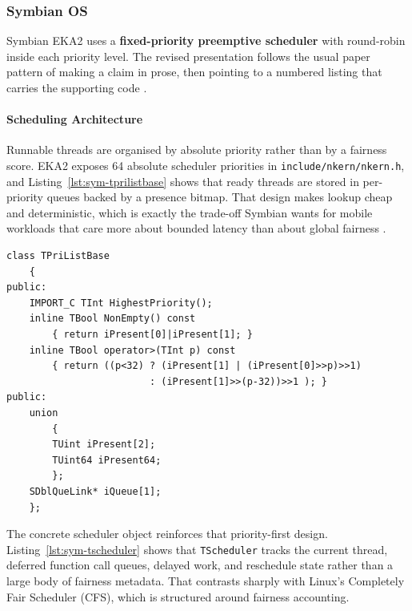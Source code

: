 \subsubsection{Symbian OS}


Symbian EKA2 uses a \textbf{fixed-priority preemptive scheduler} with
round-robin inside each priority level. The revised presentation follows the
usual paper pattern of making a claim in prose, then pointing to a numbered
listing that carries the supporting code \citep{symbian_eka2_kernel}.

\paragraph{Scheduling Architecture}

Runnable threads are organised by absolute priority rather than by a fairness
score. EKA2 exposes 64 absolute scheduler priorities in
\texttt{include/nkern/nkern.h}, and Listing~\ref{lst:sym-tprilistbase} shows
that ready threads are stored in per-priority queues backed by a presence
bitmap. That design makes lookup cheap and deterministic, which is exactly the
trade-off Symbian wants for mobile workloads that care more about bounded
latency than about global fairness \citep{sales2005, symbian_eka2_kernel}.

\begin{listing}[H]
\begin{verbatim}
class TPriListBase
	{
public:
	IMPORT_C TInt HighestPriority();
	inline TBool NonEmpty() const
		{ return iPresent[0]|iPresent[1]; }
	inline TBool operator>(TInt p) const
		{ return ((p<32) ? (iPresent[1] | (iPresent[0]>>p)>>1)
		                 : (iPresent[1]>>(p-32))>>1 ); }
public:
	union
		{
		TUint iPresent[2];
		TUint64 iPresent64;
		};
	SDblQueLink* iQueue[1];
	};
\end{verbatim}
\caption{Priority bitmap and ready-queue anchors in \texttt{nklib.h}.}
\label{lst:sym-tprilistbase}
\end{listing}

The concrete scheduler object reinforces that priority-first design.
Listing~\ref{lst:sym-tscheduler} shows that \texttt{TScheduler} tracks the
current thread, deferred function call queues, delayed work, and reschedule
state rather than a large body of fairness metadata. That contrasts sharply
with Linux's Completely Fair Scheduler (CFS), which is structured around
fairness accounting.

